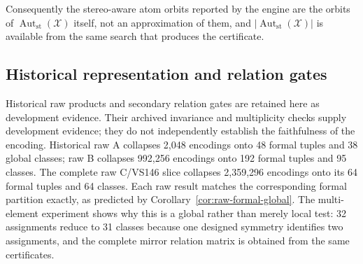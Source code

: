 \documentclass[pdflatex,sn-mathphys-num,referee,lineno]{sn-jnl}
\theoremstyle{plain}
\theoremstyle{remark}
\theoremstyle{definition}
\begin{document}
Consequently the stereo-aware atom orbits reported by the engine are the orbits
of \(\operatorname{Aut}_{\mathrm{st}}(\mathcal X)\) itself, not an
approximation of them, and \(|\operatorname{Aut}_{\mathrm{st}}(\mathcal X)|\)
is available from the same search that produces the certificate.



\subsection{Historical representation and relation gates}
\label{sec:historical-gates}

Historical raw products and secondary relation gates are retained here as
development evidence. Their archived invariance and multiplicity checks supply
development evidence;
they do not independently establish the faithfulness of the encoding.  Historical raw A collapses 2,048 encodings onto
48 formal tuples and 38 global classes; raw B collapses 992,256 encodings onto
192 formal tuples and 95 classes.  The complete raw C/VS146 slice collapses
2,359,296 encodings onto its 64 formal tuples and 64 classes.  Each raw result
matches the corresponding formal partition exactly, as predicted by
Corollary~\ref{cor:raw-formal-global}.  The
multi-element experiment shows why this is a global rather than merely local
test: 32 assignments reduce to 31 classes because one designed symmetry
identifies two assignments, and the complete mirror relation matrix is
obtained from the same certificates.
\end{document}
